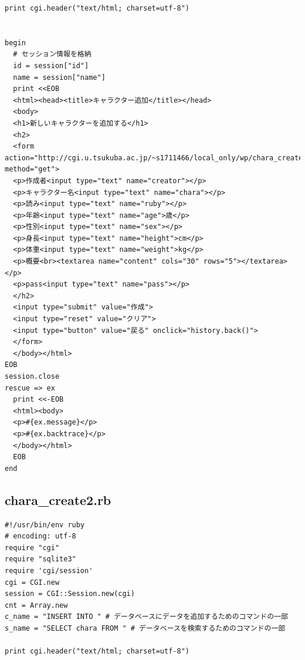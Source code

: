 \documentclass[12pt,a4paper]{jarticle}
\begin{document}
\begin{ttfamily}
\begin{oframed}
\begin{verbatim}
print cgi.header("text/html; charset=utf-8")


begin
  # セッション情報を格納
  id = session["id"]
  name = session["name"]
  print <<EOB
  <html><head><title>キャラクター追加</title></head>
  <body>
  <h1>新しいキャラクターを追加する</h1>
  <h2>
  <form action="http://cgi.u.tsukuba.ac.jp/~s1711466/local_only/wp/chara_create2.rb" method="get">
  <p>作成者<input type="text" name="creator"></p>
  <p>キャラクター名<input type="text" name="chara"></p>
  <p>読み<input type="text" name="ruby"></p>
  <p>年齢<input type="text" name="age">歳</p>
  <p>性別<input type="text" name="sex"></p>
  <p>身長<input type="text" name="height">cm</p>
  <p>体重<input type="text" name="weight">kg</p>
  <p>概要<br><textarea name="content" cols="30" rows="5"></textarea></p>
  <p>pass<input type="text" name="pass"></p>
  </h2>
  <input type="submit" value="作成">
  <input type="reset" value="クリア">
  <input type="button" value="戻る" onclick="history.back()">
  </form>
  </body></html>
EOB
session.close
rescue => ex
  print <<-EOB
  <html><body>
  <p>#{ex.message}</p>
  <p>#{ex.backtrace}</p>
  </body></html>
  EOB
end
 \end{verbatim}
\end{oframed}

\subsection*{chara\_create2.rb}
\begin{oframed}
 \fontsize{8pt}{8pt}\selectfont
 \begin{verbatim}
#!/usr/bin/env ruby
# encoding: utf-8
require "cgi"
require "sqlite3"
require 'cgi/session'
cgi = CGI.new
session = CGI::Session.new(cgi)
cnt = Array.new
c_name = "INSERT INTO " # データベースにデータを追加するためのコマンドの一部
s_name = "SELECT chara FROM " # データベースを検索するためのコマンドの一部

print cgi.header("text/html; charset=utf-8")



\end{verbatim}
\end{oframed}
\end{ttfamily}
\end{document}
